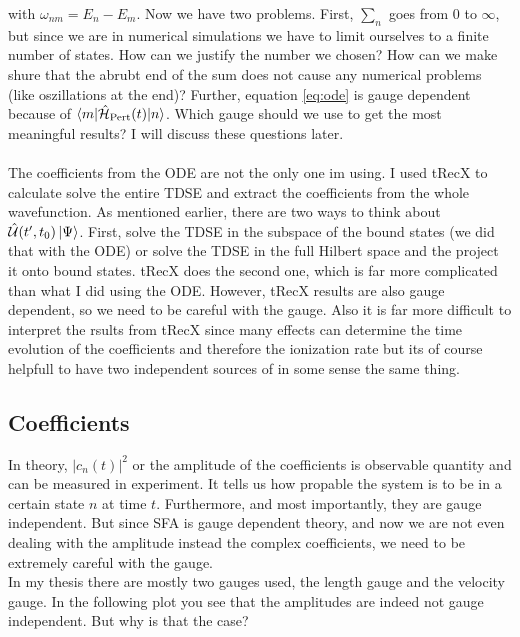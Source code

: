 with $\omega_{nm} = E_n - E_m$.
Now we have two problems.
First, $\sum_n$ goes from $0$ to $\infty$, but since we are in numerical simulations we have to limit ourselves to a finite number of states.
How can we justify the number we chosen?
How can we make shure that the abrubt end of the sum does not cause any numerical problems (like oszillations at the end)?
Further, equation \eqref{eq:ode} is gauge dependent because of $\braket{m|\hat{\mathcal{H}}_{\mathrm{Pert}}(t)|n}$. 
Which gauge should we use to get the most meaningful results?
I will discuss these questions later.\\\\
The coefficients from the ODE are not the only one im using. I used tRecX to calculate solve the entire TDSE and extract the coefficients from the whole wavefunction.
As mentioned earlier, there are two ways to think about $\hat{\mathcal{U}}(t',t_0)\ket{\Psi}$. 
First, solve the TDSE in the subspace of the bound states (we did that with the ODE) or solve the TDSE in the full Hilbert space and the project it onto bound states. 
tRecX does the second one, which is far more complicated than what I did using the ODE.
However, tRecX results are also gauge dependent, so we need to be careful with the gauge.
Also it is far more difficult to interpret the rsults from tRecX since many effects can determine the time evolution of the coefficients and therefore the ionization rate but its of course helpfull to have two independent sources of in some sense the same thing.









\subsection{Coefficients}
In theory, $|c_n(t)|^2$ or the amplitude of the coefficients is observable quantity and can be measured in experiment.
It tells us how propable the system is to be in a certain state $n$ at time $t$.
Furthermore, and most importantly, they are gauge independent.
But since SFA is gauge dependent theory, and now we are not even dealing with the amplitude instead the complex coefficients, we need to be extremely careful with the gauge.\\
In my thesis there are mostly two gauges used, the length gauge and the velocity gauge. 
In the following plot you see that the amplitudes are indeed not gauge independent. But why is that the case?\\\\

